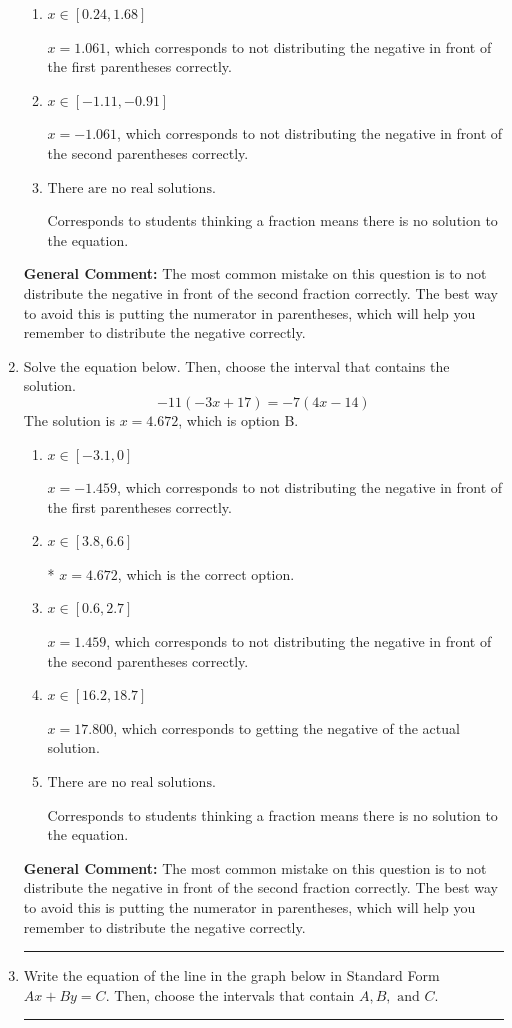 \documentclass{extbook}[14pt]
\newcommand{\litem}[1]{\item #1

\rule{\textwidth}{0.4pt}}
\begin{document}
\begin{enumerate}
{\begin{enumerate}[label=\Alph*.]
* $x = -0.327$, which is the correct option.
\item \( x \in [0.24, 1.68] \)

$x = 1.061$, which corresponds to not distributing the negative in front of the first parentheses correctly.
\item \( x \in [-1.11, -0.91] \)

$x = -1.061$, which corresponds to not distributing the negative in front of the second parentheses correctly.
\item \( \text{There are no real solutions.} \)

Corresponds to students thinking a fraction means there is no solution to the equation.
\end{enumerate}

\textbf{General Comment:} The most common mistake on this question is to not distribute the negative in front of the second fraction correctly. The best way to avoid this is putting the numerator in parentheses, which will help you remember to distribute the negative correctly.
}
\litem{
Solve the equation below. Then, choose the interval that contains the solution.
\[ -11(-3x + 17) = -7(4x -14) \]The solution is \( x = 4.672 \), which is option B.\begin{enumerate}[label=\Alph*.]
\item \( x \in [-3.1, 0] \)

$x = -1.459$, which corresponds to not distributing the negative in front of the first parentheses correctly.
\item \( x \in [3.8, 6.6] \)

* $x = 4.672$, which is the correct option.
\item \( x \in [0.6, 2.7] \)

$x = 1.459$, which corresponds to not distributing the negative in front of the second parentheses correctly.
\item \( x \in [16.2, 18.7] \)

$x = 17.800$, which corresponds to getting the negative of the actual solution.
\item \( \text{There are no real solutions.} \)

Corresponds to students thinking a fraction means there is no solution to the equation.
\end{enumerate}

\textbf{General Comment:} The most common mistake on this question is to not distribute the negative in front of the second fraction correctly. The best way to avoid this is putting the numerator in parentheses, which will help you remember to distribute the negative correctly.
}
\litem{
Write the equation of the line in the graph below in Standard Form $Ax+By=C$. Then, choose the intervals that contain $A, B, \text{ and } C$.

}
\end{enumerate}
\end{document}
